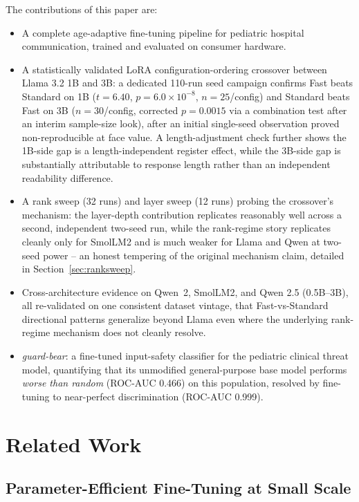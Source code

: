 \documentclass[pdflatex,sn-mathphys-num]{sn-jnl}%
\begin{document}
\medskip\noindent The contributions of this paper are:
\begin{itemize}
    \item A complete age-adaptive fine-tuning pipeline for pediatric hospital communication, trained and evaluated on consumer hardware.
    \item A statistically validated LoRA configuration-ordering crossover between Llama 3.2 1B and 3B: a dedicated 110-run seed campaign confirms Fast beats Standard on 1B ($t=6.40$, $p=6.0\times10^{-8}$, $n=25$/config) and Standard beats Fast on 3B ($n=30$/config, corrected $p=0.0015$ via a combination test after an interim sample-size look), after an initial single-seed observation proved non-reproducible at face value. A length-adjustment check further shows the 1B-side gap is a length-independent register effect, while the 3B-side gap is substantially attributable to response length rather than an independent readability difference.
    \item A rank sweep (32 runs) and layer sweep (12 runs) probing the crossover's mechanism: the layer-depth contribution replicates reasonably well across a second, independent two-seed run, while the rank-regime story replicates cleanly only for SmolLM2 and is much weaker for Llama and Qwen at two-seed power -- an honest tempering of the original mechanism claim, detailed in Section~\ref{sec:ranksweep}.
    \item Cross-architecture evidence on Qwen~2, SmolLM2, and Qwen 2.5 (0.5B--3B), all re-validated on one consistent dataset vintage, that Fast-vs-Standard directional patterns generalize beyond Llama even where the underlying rank-regime mechanism does not cleanly resolve.
    \item \textit{guard-bear}: a fine-tuned input-safety classifier for the pediatric clinical threat model, quantifying that its unmodified general-purpose base model performs \textit{worse than random} (ROC-AUC 0.466) on this population, resolved by fine-tuning to near-perfect discrimination (ROC-AUC 0.999).
\end{itemize}

\section{Related Work}\label{sec:relatedwork}

\subsection{Parameter-Efficient Fine-Tuning at Small Scale}
\end{document}

